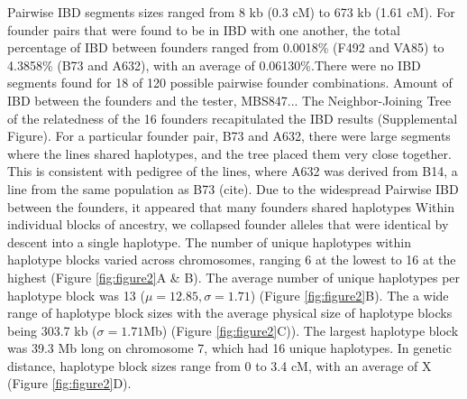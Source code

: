 \documentclass[article,9pt,twocolumn,twoside]{rilabRxiv}
\begin{document}
Pairwise IBD segments sizes ranged from 8 kb (0.3 cM) to  673 kb (1.61 cM).
For founder pairs that were found to be in IBD with one another, the total percentage of IBD between founders ranged from 0.0018\% (F492 and VA85) to 4.3858\% (B73 and A632), with an average of 0.06130\%.There were no IBD segments found for 18 of 120 possible pairwise founder combinations.
Amount of IBD between the founders and the tester, MBS847...
The Neighbor-Joining Tree of the relatedness of the 16 founders recapitulated the IBD results (Supplemental Figure). For a particular founder pair, B73 and A632, there were large segments where the lines shared haplotypes, and the tree placed them very close together.
This is consistent with pedigree of the lines, where A632 was derived from B14, a line from the same population as B73 (cite).
Due to the widespread Pairwise IBD between the founders, it appeared that many founders shared haplotypes
Within individual blocks of ancestry, we collapsed founder alleles that were identical by descent into a single haplotype.
The number of unique haplotypes within haplotype blocks varied across chromosomes, ranging 6 at the lowest to 16 at the highest (Figure  \ref{fig:figure2}A & B). The average number of unique haplotypes per haplotype block was 13 ($\mu = 12.85, \sigma =1.71$) (Figure \ref{fig:figure2}B).
The a wide range of haplotype block sizes with the average physical size of haplotype blocks being 303.7 kb ($\sigma =1.71$Mb) (Figure \ref{fig:figure2}C)).
The largest haplotype block was 39.3 Mb long on chromosome 7, which had 16 unique haplotypes.
In genetic distance, haplotype block sizes range from 0 to 3.4 cM, with an average of X (Figure \ref{fig:figure2}D).
\end{document}
